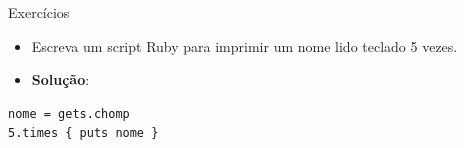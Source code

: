 \begin{frame}{Exercícios}
  \begin{itemize}
    \item Escreva um script Ruby para imprimir um nome lido teclado 5 vezes.
  \end{itemize}
\framebreak
  \begin{itemize}
    \item \textbf{Solução}:
  \end{itemize}	
  \begin{lstlisting}[style=RubyInputStyle]
nome = gets.chomp
5.times { puts nome }
  \end{lstlisting}
\end{frame}
